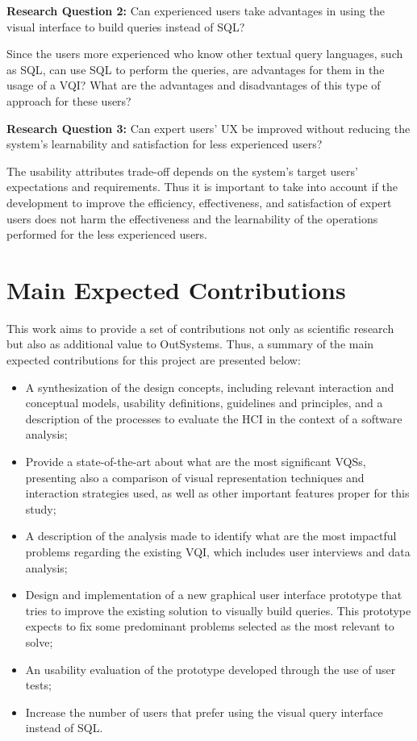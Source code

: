 \medskip

\textbf{Research Question 2:} Can experienced users take advantages in using the visual interface to build queries instead of \gls{SQL}?

\medskip

Since the users more experienced who know other textual query languages, such as \gls{SQL}, can use \gls{SQL} to perform the queries, are advantages for them in the usage of a \gls{VQI}? What are the advantages and disadvantages of this type of approach for these users?

\medskip

\textbf{Research Question 3:} Can expert users' \gls{UX} be improved without reducing the system's learnability and satisfaction for less experienced users?


\medskip

The usability attributes trade-off depends on the system's target users' expectations and requirements. Thus it is important to take into account if the development to improve the efficiency, effectiveness, and satisfaction of expert users does not harm the effectiveness and the learnability of the operations performed for the less experienced users.

\section{Main Expected Contributions}
\label{sec:main_exp_contributions}
This work aims to provide a set of contributions not only as scientific research but also as additional value to OutSystems. Thus, a summary of the main expected contributions for this project are presented below:

\begin{itemize}
  \item A synthesization of the design concepts, including relevant interaction and conceptual models, usability definitions, guidelines and principles, and a description of the processes to evaluate the \gls{HCI} in the context of a software analysis;
  \item Provide a state-of-the-art about what are the most significant \glspl{VQS}, presenting also a comparison of visual representation techniques and interaction strategies used, as well as other important features proper for this study;
  \item A description of the analysis made to identify what are the most impactful problems regarding the existing \gls{VQI}, which includes user interviews and data analysis;
  \item Design and implementation of a new graphical user interface prototype that tries to improve the existing solution to visually build queries. This prototype expects to fix some predominant problems selected as the most relevant to solve;
  \item An usability evaluation of the prototype developed through the use of user tests;
  \item Increase the number of users that prefer using the visual query interface instead of SQL.
\end{itemize} 

